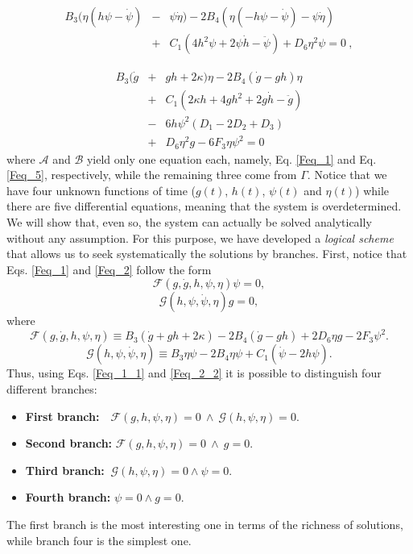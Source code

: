 \begin{eqnarray}
    \label{Feq_4}
    B_3(\eta(h\psi -\dot{\psi}) &-&\psi\dot{\eta}) - 2B_4(\eta(-h\psi - \dot{\psi}) - \psi\dot{\eta})   \\ &+& C_1(4h^2\psi + 2\psi\dot{h} -\ddot{\psi}) + D_6\eta^2\psi = 0 \ ,\nonumber 
\end{eqnarray}

\begin{eqnarray}
    \label{Feq_5}
    B_3(\dot{g} &+& gh + 2\kappa)\eta - 2B_4\left(\dot{g} - gh\right)\eta \nonumber \\ &+& C_1(2\kappa h + 4gh^2  + 2g\dot{h}- \ddot{g}) \nonumber \\ &-& 6h\psi^2\left(D_1 - 2D_2 + D_3\right) \nonumber \\ &+& D_6 \eta^2 g - 6F_3\eta\psi^2 = 0
\end{eqnarray}
where $\mathcal{A}$ and $\mathcal{B}$ yield only one equation each, namely,  Eq. \eqref{Feq_1} and Eq. \eqref{Feq_5}, respectively, 
while the remaining three come from $\Gamma$. Notice that we have four unknown functions 
of time ($g(t)$, $h(t)$, $\psi(t)$ and $\eta(t)$) while there are five differential equations, meaning that the system is overdetermined. We will show that, even so, the system can actually be solved analytically without any assumption. For this purpose, we have developed a \textit{logical scheme} that allows us to seek systematically the solutions by branches. First, notice that Eqs. \eqref{Feq_1} 
and \eqref{Feq_2} follow the form
\begin{dmath}
    \label{Feq_1_1}
    \mathcal{F}(g, \dot{g}, h,\psi,\eta)\psi = 0,
\end{dmath}
\begin{dmath}
    \label{Feq_2_2}
    \mathcal{G}(h,\psi, \dot{\psi}, \eta)g = 0,
\end{dmath}
where
\begin{dmath}
\mathcal{F}(g,\dot{g},h,\psi,\eta)  \equiv B_3\left(\dot{g} + gh + 2\kappa\right) - 2B_4\left(\dot{g} - gh\right) + 2D_6\eta g - 2F_3\psi^2.
\end{dmath}
\begin{dmath}
\mathcal{G}(h,\psi, \dot{\psi}, \eta)  \equiv B_3\eta\psi -2B_4\eta\psi + C_1\left(\dot{\psi} - 2h\psi\right).
\end{dmath}
Thus, using Eqs. \eqref{Feq_1_1} and \eqref{Feq_2_2} it is possible to distinguish four different branches:
\begin{itemize}
    \item {\bf First branch:}  { $ \ \ \ \mathcal{F}(g,h,\psi,\eta) \! = 0 \ \wedge \ \mathcal{G}(h,\psi,\eta) \!= \! 0$}.
    \item {\bf Second branch:} $ \mathcal{F}(g,h,\psi,\eta)  = 0 \ \wedge \ g  = 0$.
    \item {\bf Third branch:}   $\ \mathcal{G}(h,\psi,\eta)   = 0   \wedge  \psi  = 0$.
    \item {\bf Fourth branch:} $\psi  = 0  \wedge  g  = 0$.
\end{itemize}
The first branch is the most interesting one in terms of the richness of solutions, while branch four is the simplest one. 


